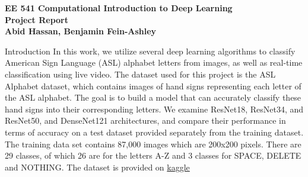 \documentclass[12pt, a4paper]{article}
\newcommand{\coursename}{EE 541 Computational Introduction to Deep Learning}
\newcommand{\doctitle}{Project Report}
\newcommand{\name}{Abid Hassan, Benjamin Fein-Ashley}
\begin{document}
\begin{center}
\small
\textbf{\coursename} \\
\Large
\bfseries
\doctitle \\
\vspace{0.8cm}
\small
{\normalfont\small \name}
\end{center}

\thispagestyle{plain}

\noindent

\newpage

\begin{section}{Introduction}
    In this work, we utilize several deep learning algorithms to classify American Sign Language (ASL) alphabet letters from images, as well as real-time classification using live video. The dataset used for this project is the ASL Alphabet dataset, which contains images of hand signs representing each letter of the ASL alphabet. The goal is to build a model that can accurately classify these hand signs into their corresponding letters.
    We examine ResNet18, ResNet34, and ResNet50, and DenseNet121 architectures, and compare their performance in terms of accuracy on a test dataset provided separately from the training dataset. The training data set contains 87,000 images which are 200x200 pixels. There are 29 classes, of which 26 are for the letters A-Z and 3 classes for SPACE, DELETE and NOTHING. The dataset is provided on \href{https://www.kaggle.com/datasets/grassknoted/asl-alphabet?resource=download}{kaggle}
\end{section}
\end{document}
